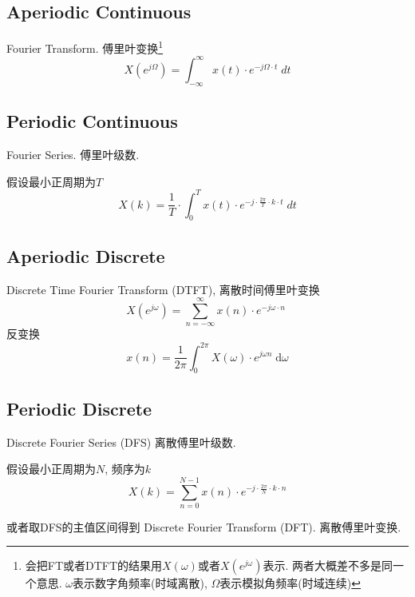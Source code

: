 \documentclass[a4paper]{report}
\begin{document}
\subsection{Aperiodic Continuous}
Fourier Transform. 傅里叶变换\footnote{会把FT或者DTFT的结果用$X(\omega)$或者$X(e^{j\omega})$表示. 两者大概差不多是同一个意思. $\omega$表示数字角频率(时域离散), $\Omega$表示模拟角频率(时域连续)}
\begin{equation}
  X(e^{j\Omega})=\int_{-\infty}^\infty x(t)\cdot e^{-j\Omega\cdot t}\; dt
\end{equation}
\subsection{Periodic Continuous}
Fourier Series. 傅里叶级数. 

假设最小正周期为$T$
\begin{equation}
  X(k)=\frac{1}{T}\cdot\int_0^T x(t)\cdot e^{-j\cdot\frac{2\pi}{T}\cdot k\cdot t} \; dt
\end{equation}

\subsection{Aperiodic Discrete}
Discrete Time Fourier Transform (DTFT), 离散时间傅里叶变换
\begin{equation}
  X(e^{j\omega})=\displaystyle\sum_{n=-\infty}^\infty x(n)\cdot e^{-j\omega\cdot n}\; 
\end{equation}
反变换
\begin{equation}
  x(n)=\frac{1}{2\pi}\int_0^{2\pi}X(\omega)\cdot e^{j\omega n} \;\text{d}\omega
\end{equation}
\subsection{Periodic Discrete}
Discrete Fourier Series (DFS) 离散傅里叶级数. 

假设最小正周期为$N$, 频序为$k$
\begin{equation}
  X(k)=\displaystyle\sum_{n=0}^{N-1}x(n)\cdot e^{-j\cdot\frac{2\pi}{N}\cdot k\cdot n}
\end{equation}

或者取DFS的主值区间得到 Discrete Fourier Transform (DFT). 离散傅里叶变换. 

\end{document}
